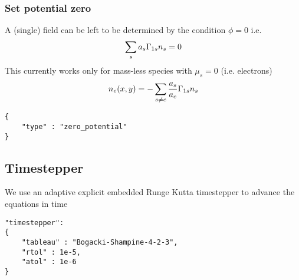 \subsubsection{ Set potential zero}
A (single) field can be left to be determined by the condition $\phi = 0$ i.e.
\begin{align}
    \sum_s a_s \Gamma_{1s} {n_s}  = 0
\end{align}
This currently works only for mass-less species with $\mu_s =0$ (i.e. electrons)
\begin{align}
    n_e(x,y) = -\sum_{s\neq e} \frac{a_s}{a_e} \Gamma_{1s}{n_s} 
\end{align}
\begin{verbatim}
{
    "type" : "zero_potential"
}
\end{verbatim}
\subsection{Timestepper}
We use an adaptive explicit embedded Runge Kutta timestepper to advance the equations in time
\begin{verbatim}
"timestepper":
{
    "tableau" : "Bogacki-Shampine-4-2-3",
    "rtol" : 1e-5,
    "atol" : 1e-6
}
\end{verbatim}



